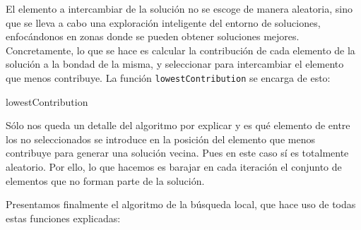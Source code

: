 \documentclass[11pt,a4paper]{article}
\begin{document}
El elemento a intercambiar de la solución no se escoge de manera aleatoria, sino que se lleva a cabo una exploración inteligente del entorno de soluciones, enfocándonos en zonas donde se pueden obtener soluciones mejores. Concretamente, lo que se hace es calcular la contribución de cada elemento de la solución a la bondad de la misma, y seleccionar para intercambiar el elemento que menos contribuye. 
La función \lstinline|lowestContribution| se encarga de esto:

	\begin{algorithm}[H]
	\caption{\sc lowestContribution}
	\end{algorithm}
\vspace{8mm}
 	Sólo nos queda un detalle del algoritmo por explicar y es qué elemento de entre los no seleccionados se introduce en la posición del elemento que menos contribuye para generar una solución vecina. Pues en este caso sí es totalmente aleatorio. Por ello, lo que hacemos es barajar en cada iteración el conjunto de elementos que no forman parte de la solución. 

	Presentamos finalmente el algoritmo de la búsqueda local, que hace uso de todas estas funciones explicadas:
	
\end{document}
